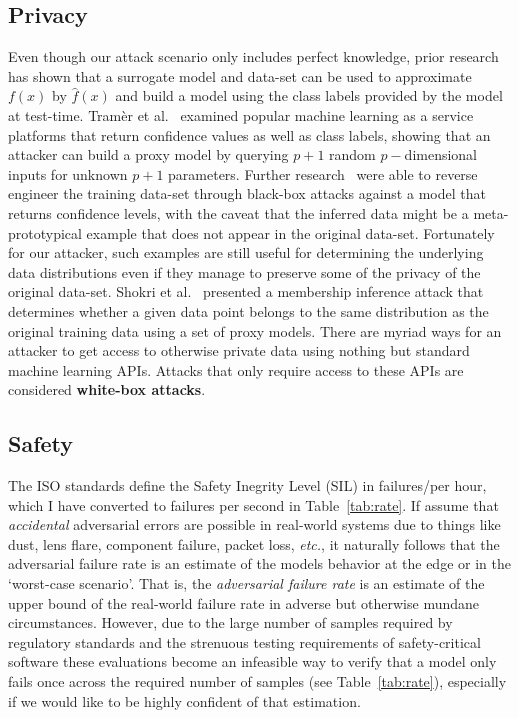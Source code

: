 \documentclass[conference]{IEEEtran}
\begin{document}
\subsection{Privacy }
\label{privacy}
Even though our attack scenario only includes perfect knowledge, prior research~\cite{fredrikson2015model, biggio2013evasion, chakraborty2018adversarial, wang2019security, ateniese2015hacking} has shown that a surrogate model and data-set can be used to approximate $f(x)$ by $\hat{f}(x)$ and build a model using the class labels provided by the model at test-time. Tram\`er et al.~\cite{tramer2016stealing} examined popular machine learning as a service platforms that return confidence values as well as class labels, showing that an attacker can build a proxy model by querying $ p + 1$ random $p-$dimensional inputs for unknown $p+1$ parameters. Further research~\cite{fredrikson2015model} were able to reverse engineer the training data-set through black-box attacks against a model that returns confidence levels, with the caveat that the inferred data might be a meta-prototypical example that does not appear in the original data-set. Fortunately for our attacker, such examples are still useful for determining the underlying data distributions even if they manage to preserve some of the privacy of the original data-set. Shokri et al.~\cite{shokri2017membership} presented a membership inference attack that determines whether a given data point belongs to the same distribution as the original training data using a set of proxy models. There are myriad ways for an attacker to get access to otherwise private data using nothing but standard machine learning APIs. Attacks that only require access to these APIs are considered \textbf{white-box attacks}.

\subsection{Safety}
The ISO standards \cite{iso26262} define the Safety Inegrity Level (SIL) in failures/per hour, which I have converted to failures per second in Table~\ref{tab:rate}. If assume that \textit{accidental} adversarial errors are possible in real-world systems due to things like dust, lens flare, component failure, packet loss, \textit{etc.}, it naturally follows that the adversarial failure rate is an estimate of the models behavior at the edge or in the `worst-case scenario'. That is, the \textit{adversarial failure rate} is an estimate of the upper bound of the real-world failure rate in adverse but otherwise mundane circumstances. However, due to the large number of samples required by regulatory standards  and the strenuous testing requirements of safety-critical software these evaluations become an infeasible way to verify that a model only fails once across the required number of samples (see Table~\ref{tab:rate}), especially if we would like to be highly confident of that estimation.
\end{document}
